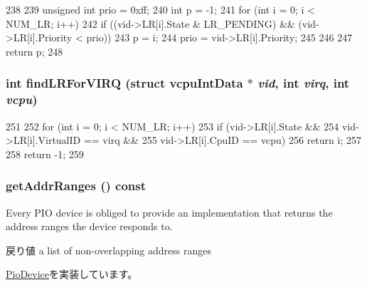\begin{DoxyCode}
238     {
239         unsigned int prio = 0xff;
240         int p = -1;
241         for (int i = 0; i < NUM_LR; i++) {
242             if ((vid->LR[i].State & LR_PENDING) && (vid->LR[i].Priority < prio)) 
      {
243                 p = i;
244                 prio = vid->LR[i].Priority;
245             }
246         }
247         return p;
248     }
\end{DoxyCode}
\hypertarget{classVGic_a8498dbf7b539714834568e7284487cbe}{
\subsubsection[{findLRForVIRQ}]{\setlength{\rightskip}{0pt plus 5cm}int findLRForVIRQ (struct vcpuIntData $\ast$ {\em vid}, \/  int {\em virq}, \/  int {\em vcpu})}}
\label{classVGic_a8498dbf7b539714834568e7284487cbe}



\begin{DoxyCode}
251     {
252         for (int i = 0; i < NUM_LR; i++) {
253             if (vid->LR[i].State &&
254                 vid->LR[i].VirtualID == virq &&
255                 vid->LR[i].CpuID == vcpu)
256                 return i;
257         }
258         return -1;
259     }
\end{DoxyCode}
\hypertarget{classVGic_a36cf113d5e5e091ebddb32306c098fae}{
\subsubsection[{getAddrRanges}]{ getAddrRanges () const}}
\label{classVGic_a36cf113d5e5e091ebddb32306c098fae}
Every PIO device is obliged to provide an implementation that returns the address ranges the device responds to.

\begin{DoxyReturn}{戻り値}
a list of non-\/overlapping address ranges 
\end{DoxyReturn}


\hyperlink{classPioDevice_a6e967f8921e80748eb2be35b6b481a7e}{PioDevice}を実装しています。



